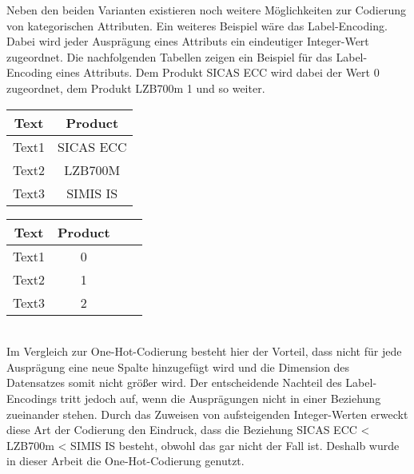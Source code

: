 Neben den beiden Varianten existieren noch weitere Möglichkeiten zur Codierung von kategorischen Attributen. Ein weiteres Beispiel wäre das Label-Encoding. Dabei wird jeder Ausprägung eines Attributs
ein eindeutiger Integer-Wert zugeordnet. Die nachfolgenden Tabellen zeigen ein Beispiel für das Label-Encoding eines Attributs. Dem Produkt \glqq SICAS ECC\grqq{} wird dabei der Wert 0 zugeordnet,
dem Produkt \glqq LZB700m\grqq{} 1 und so weiter. 
\\
\begin{minipage}[c]{0.5\textwidth}
    \centering
    \begin{tabular}{|c|c|}
        \hline
        \textbf{Text} & \textbf{Product}\\ \hline
        Text1 & SICAS ECC\\
        Text2 & LZB700M\\
        Text3 & SIMIS IS\\
        \hline
    \end{tabular}
\end{minipage}
\begin{minipage}[c]{0.5\textwidth}
    \centering
    \begin{tabular}{|c|c|c|c|}
        \hline
        \textbf{Text} & \textbf{Product} \\ \hline
        Text1 & 0\\
        Text2 & 1\\
        Text3 & 2\\
        \hline
    \end{tabular}
\end{minipage}
\\
Im Vergleich zur One-Hot-Codierung besteht hier der Vorteil, dass nicht für jede Ausprägung eine neue Spalte hinzugefügt wird und 
die Dimension des Datensatzes somit nicht größer wird. Der entscheidende Nachteil des Label-Encodings tritt jedoch auf, wenn die Ausprägungen nicht in einer Beziehung zueinander stehen.
Durch das Zuweisen von aufsteigenden Integer-Werten erweckt diese Art der Codierung den Eindruck, dass die Beziehung \glqq SICAS ECC\grqq{} < \glqq LZB700m\grqq{} < \glqq SIMIS IS\grqq{} besteht,
obwohl das gar nicht der Fall ist. Deshalb wurde in dieser Arbeit die One-Hot-Codierung genutzt.
